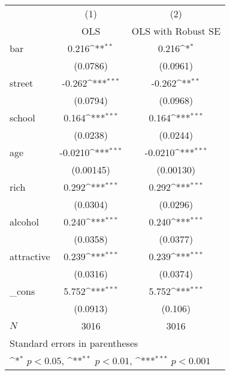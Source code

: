 {
\def\sym#1{\ifmmode^{#1}\else\(^{#1}\)\fi}
\begin{tabular}{l*{2}{c}}
\hline\hline
            &\multicolumn{1}{c}{(1)}&\multicolumn{1}{c}{(2)}\\
            &\multicolumn{1}{c}{OLS}&\multicolumn{1}{c}{OLS with Robust SE}\\
\hline
bar         &       0.216\sym{**} &       0.216\sym{*}  \\
            &    (0.0786)         &    (0.0961)         \\
[1em]
street      &      -0.262\sym{***}&      -0.262\sym{**} \\
            &    (0.0794)         &    (0.0968)         \\
[1em]
school      &       0.164\sym{***}&       0.164\sym{***}\\
            &    (0.0238)         &    (0.0244)         \\
[1em]
age         &     -0.0210\sym{***}&     -0.0210\sym{***}\\
            &   (0.00145)         &   (0.00130)         \\
[1em]
rich        &       0.292\sym{***}&       0.292\sym{***}\\
            &    (0.0304)         &    (0.0296)         \\
[1em]
alcohol     &       0.240\sym{***}&       0.240\sym{***}\\
            &    (0.0358)         &    (0.0377)         \\
[1em]
attractive  &       0.239\sym{***}&       0.239\sym{***}\\
            &    (0.0316)         &    (0.0374)         \\
[1em]
\_cons      &       5.752\sym{***}&       5.752\sym{***}\\
            &    (0.0913)         &     (0.106)         \\
\hline
\(N\)       &        3016         &        3016         \\
\hline\hline
\multicolumn{3}{l}{\footnotesize Standard errors in parentheses}\\
\multicolumn{3}{l}{\footnotesize \sym{*} \(p<0.05\), \sym{**} \(p<0.01\), \sym{***} \(p<0.001\)}\\
\end{tabular}
}
